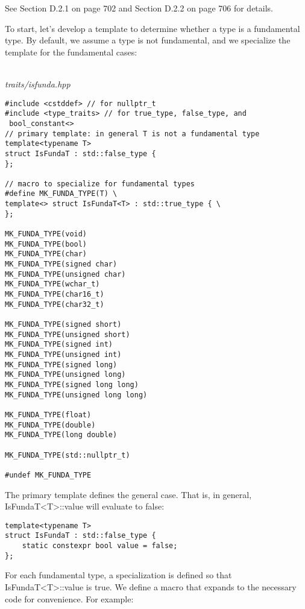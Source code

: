 See Section D.2.1 on page 702 and Section D.2.2 on page 706 for details.


To start, let’s develop a template to determine whether a type is a fundamental type. By default, we assume a type is not fundamental, and we specialize the template for the fundamental cases:

\hspace*{\fill} \\ %
\noindent
\textit{traits/isfunda.hpp}
\begin{lstlisting}[style=styleCXX]
#include <cstddef> // for nullptr_t
#include <type_traits> // for true_type, false_type, and
 bool_constant<>
// primary template: in general T is not a fundamental type
template<typename T>
struct IsFundaT : std::false_type {
};

// macro to specialize for fundamental types
#define MK_FUNDA_TYPE(T) \
template<> struct IsFundaT<T> : std::true_type { \
};

MK_FUNDA_TYPE(void)
MK_FUNDA_TYPE(bool)
MK_FUNDA_TYPE(char)
MK_FUNDA_TYPE(signed char)
MK_FUNDA_TYPE(unsigned char)
MK_FUNDA_TYPE(wchar_t)
MK_FUNDA_TYPE(char16_t)
MK_FUNDA_TYPE(char32_t)

MK_FUNDA_TYPE(signed short)
MK_FUNDA_TYPE(unsigned short)
MK_FUNDA_TYPE(signed int)
MK_FUNDA_TYPE(unsigned int)
MK_FUNDA_TYPE(signed long)
MK_FUNDA_TYPE(unsigned long)
MK_FUNDA_TYPE(signed long long)
MK_FUNDA_TYPE(unsigned long long)

MK_FUNDA_TYPE(float)
MK_FUNDA_TYPE(double)
MK_FUNDA_TYPE(long double)

MK_FUNDA_TYPE(std::nullptr_t)

#undef MK_FUNDA_TYPE
\end{lstlisting}



The primary template defines the general case. That is, in general, IsFundaT<T>::value will evaluate to false:

\begin{lstlisting}[style=styleCXX]
template<typename T>
struct IsFundaT : std::false_type {
	static constexpr bool value = false;
};
\end{lstlisting}

For each fundamental type, a specialization is defined so that IsFundaT<T>::value is true. We define a macro that expands to the necessary code for convenience. For example:

